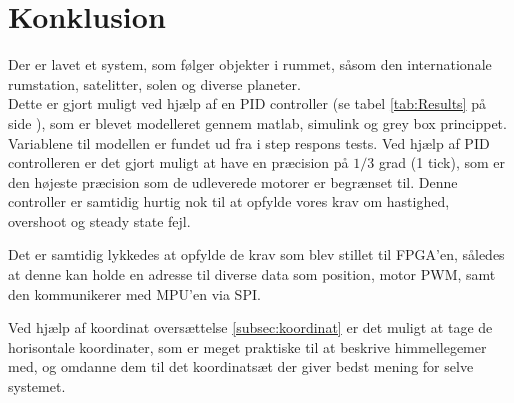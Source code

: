 \section{Konklusion}
Der er lavet et system, som følger objekter i rummet, såsom den internationale rumstation, satelitter, solen og diverse planeter.\\
Dette er gjort muligt ved hjælp af en PID controller (se tabel \ref{tab:Results} på side \pageref{tab:Results}), som er blevet modelleret gennem matlab, simulink og grey box princippet. Variablene til modellen er fundet ud fra i step respons tests. Ved hjælp af PID controlleren er det gjort muligt at have en præcision på $1/3$ grad (1 tick), som er den højeste præcision som de udleverede motorer er begrænset til. Denne controller er samtidig hurtig nok til at opfylde vores krav om hastighed, overshoot og steady state fejl.

Det er samtidig lykkedes at opfylde de krav som blev stillet til FPGA'en, således at denne kan holde en adresse til diverse data som position, motor PWM, samt den kommunikerer med MPU'en via SPI.

Ved hjælp af koordinat oversættelse \ref{subsec:koordinat} er det muligt at tage de horisontale koordinater, som er meget praktiske til at beskrive himmellegemer med, og omdanne dem til det koordinatsæt der giver bedst mening for selve systemet.